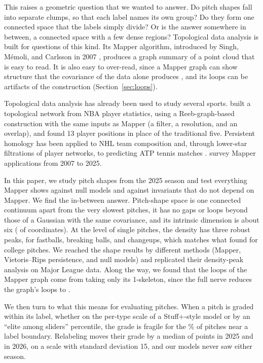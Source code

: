 \documentclass{article}
\theoremstyle{definition}
\theoremstyle{remark}
\begin{document}
This raises a geometric question that we wanted to answer.
Do pitch shapes fall into separate clumps, so that each label names its own group?
Do they form one connected space that the labels simply divide?
Or is the answer somewhere in between, a connected space with a few dense regions?
Topological data analysis is built for questions of this kind.
Its Mapper algorithm, introduced by Singh, M\'emoli, and Carlsson in 2007 \parencite{singh2007mapper}, produces a graph summary of a point cloud that is easy to read.
It is also easy to over-read, since a Mapper graph can show structure that the covariance of the data alone produces \parencite{topaz2026null}, and its loops can be artifacts of the construction (Section~\ref{sec:loops}).

Topological data analysis has already been used to study several sports.
\textcite{lum2013extracting} built a topological network from NBA player statistics, using a Reeb-graph-based construction with the same inputs as Mapper (a filter, a resolution, and an overlap), and found 13 player positions in place of the traditional five.
Persistent homology has been applied to NHL team composition \parencite{goldfarb2014hockey} and, through lower-star filtrations of player networks, to predicting ATP tennis matches \parencite{schwaderer2026tennis}.
\textcite{madukpe2026review} survey Mapper applications from 2007 to 2025.

In this paper, we study \NShapes{} pitch shapes from the 2025 season and test everything Mapper shows against null models and against invariants that do not depend on Mapper.
We find the in-between answer.
Pitch-shape space is one connected continuum apart from the very slowest pitches, it has no gaps or loops beyond those of a Gaussian with the same covariance, and its intrinsic dimension is about six (\DimMLE{} of \NFeatures{} coordinates).
At the level of single pitches, the density has three robust peaks, for fastballs, breaking balls, and changeups, which matches what \textcite{maloof2026classify} found for college pitches.
We reached the shape results by different methods (Mapper, Vietoris--Rips persistence, and null models) and replicated their density-peak analysis on Major League data.
Along the way, we found that the loops of the Mapper graph come from taking only its 1-skeleton, since the full nerve reduces the graph's \GraphBone{} loops to \NerveBone.

We then turn to what this means for evaluating pitches.
When a pitch is graded within its label, whether on the per-type scale of a Stuff+-style model or by an ``elite among sliders'' percentile, the grade is fragile for the \LSTwentyFiveBoundaryPct\% of pitches near a label boundary.
Relabeling moves their grade by a median of \LSTwentyFiveShift{} points in 2025 and \LSTwentySixShift{} in 2026, on a scale with standard deviation 15, and our models never saw either season.
\end{document}
